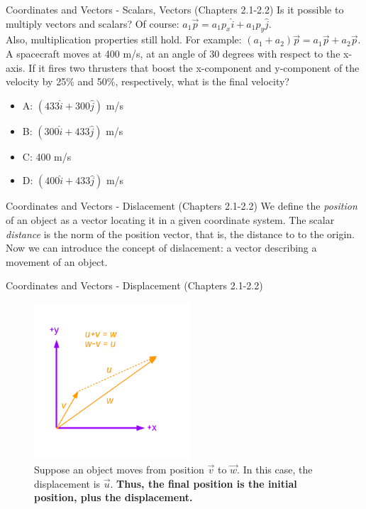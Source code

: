 \documentclass{beamer}
\begin{document}
\begin{frame}{Coordinates and Vectors - Scalars, Vectors (Chapters 2.1-2.2)}
Is it possible to multiply vectors and scalars?  Of course: $a_1\vec{p} = a_1p_x\hat{i}+a_1p_y\hat{j}$.\\
\vspace{0.2cm}
Also, multiplication properties still hold.  For example: $(a_1+a_2)\vec{p} = a_1\vec{p}+a_2\vec{p}$. \\
\vspace{0.2cm}
\small
A spacecraft moves at 400 m/s, at an angle of 30 degrees with respect to the x-axis.  If it fires two thrusters that boost the x-component and y-component of the velocity by 25\% and 50\%, respectively, what is the final velocity?
\begin{itemize}
\item A: $(433\hat{i}+300\hat{j})$ m/s
\item B: $(300\hat{i}+433\hat{j})$ m/s
\item C: 400 m/s
\item D: $(400\hat{i}+433\hat{j})$ m/s
\end{itemize}
\end{frame}

\begin{frame}{Coordinates and Vectors - Dislacement (Chapters 2.1-2.2)}
We define the \textit{position} of an object as a vector locating it in a given coordinate system.  The scalar \textit{distance} is the norm of the position vector, that is, the distance to to the origin. \\
\vspace{0.5cm}
Now we can introduce the concept of \alert{dislacement}: a vector describing a movement of an object.
\end{frame}

\begin{frame}{Coordinates and Vectors - Displacement (Chapters 2.1-2.2)}
\begin{figure}
\centering
\includegraphics[width=0.52\textwidth]{figures/Vectors4.pdf}
\caption{\label{fig:displacement} Suppose an object moves from position $\vec{v}$ to $\vec{w}$.  In this case, the \alert{displacement} is $\vec{u}$. \textbf{Thus, the final position is the initial position, plus the displacement.}}
\end{figure}
\end{frame}
\end{document}
